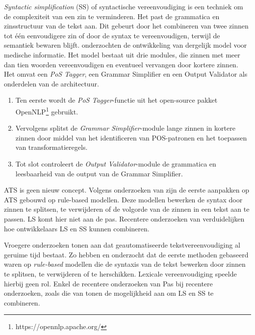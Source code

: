 \medspace

\textit{Syntactic simplification} (SS) of syntactische vereenvoudiging is een techniek om de complexiteit van een zin te verminderen. Het past de grammatica en zinsstructuur van de tekst aan. Dit gebeurt door het combineren van twee zinnen tot één eenvoudigere zin of door de syntax te vereenvoudigen, terwijl de semantiek bewaren blijft. \textcite{Kandula2010} onderzochten de ontwikkeling van dergelijk model voor medische informatie. Het model bestaat uit drie modules, die zinnen met meer dan tien woorden vereenvoudigen en eventueel vervangen door kortere zinnen. Het omvat een \textit{PoS Tagger}, een Grammar Simplifier en een Output Validator als onderdelen van de architectuur.

\medspace

\begin{enumerate}
	\item Ten eerste wordt de \textit{PoS Tagger}-functie uit het open-source pakket OpenNLP\footnote{https://opennlp.apache.org/} gebruikt.
	\item Vervolgens splitst de \textit{Grammar Simplifier}-module lange zinnen in kortere zinnen door middel van het identificeren van POS-patronen en het toepassen van transformatieregels.
	\item Tot slot controleert de \textit{Output Validator}-module de grammatica en leesbaarheid van de output van de Grammar Simplifier.
\end{enumerate}  

\medspace

ATS is geen nieuw concept. Volgens onderzoeken van \textcite{Canning2000, Siddharthan2006} zijn de eerste aanpakken op ATS gebouwd op rule-based modellen. Deze modellen bewerken de syntax door zinnen te splitsen, te verwijderen of de volgorde van de zinnen in een tekst aan te passen. LS komt hier niet aan de pas. Recentere onderzoeken van \textcite{Coster2011, Bulte2018} verduidelijken hoe ontwikkelaars LS en SS kunnen combineren.

\medspace

Vroegere onderzoeken tonen aan dat geautomatiseerde tekstvereenvoudiging al geruime tijd bestaat. Zo hebben \textcite{Canning2000} en \textcite{Siddharthan2006} onderzocht dat de eerste methoden gebaseerd waren op \textit{rule-based} modellen die de syntaxis van de tekst bewerken door zinnen te splitsen, te verwijderen of te herschikken. Lexicale vereenvoudiging speelde hierbij geen rol. Enkel de recentere onderzoeken van  Pas bij recentere onderzoeken, zoals die van \textcite{Coster2011, Bulte2018} tonen de mogelijkheid aan om LS en SS te combineren.


